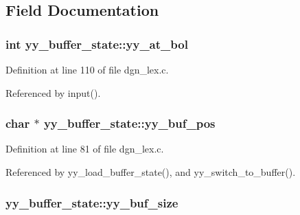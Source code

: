 \subsection{Field Documentation}
\hypertarget{structyy__buffer__state_a9d60c60af6e1a6f69de16871fd64f85f}{
\subsubsection[{yy\+\_\+at\+\_\+bol}]{\setlength{\rightskip}{0pt plus 5cm}int yy\+\_\+buffer\+\_\+state\+::yy\+\_\+at\+\_\+bol}}\label{structyy__buffer__state_a9d60c60af6e1a6f69de16871fd64f85f}


Definition at line 110 of file dgn\+\_\+lex.\+c.



Referenced by input().

\hypertarget{structyy__buffer__state_a8435c3f786bbb55d21d0174e4cfc22a0}{
\subsubsection[{yy\+\_\+buf\+\_\+pos}]{\setlength{\rightskip}{0pt plus 5cm}char $\ast$ yy\+\_\+buffer\+\_\+state\+::yy\+\_\+buf\+\_\+pos}}\label{structyy__buffer__state_a8435c3f786bbb55d21d0174e4cfc22a0}


Definition at line 81 of file dgn\+\_\+lex.\+c.



Referenced by yy\+\_\+load\+\_\+buffer\+\_\+state(), and yy\+\_\+switch\+\_\+to\+\_\+buffer().

\hypertarget{structyy__buffer__state_a48302f5f3477a9c78bbddf56d356ef54}{
\subsubsection[{yy\+\_\+buf\+\_\+size}]{ yy\+\_\+buffer\+\_\+state\+::yy\+\_\+buf\+\_\+size}}\label{structyy__buffer__state_a48302f5f3477a9c78bbddf56d356ef54}



